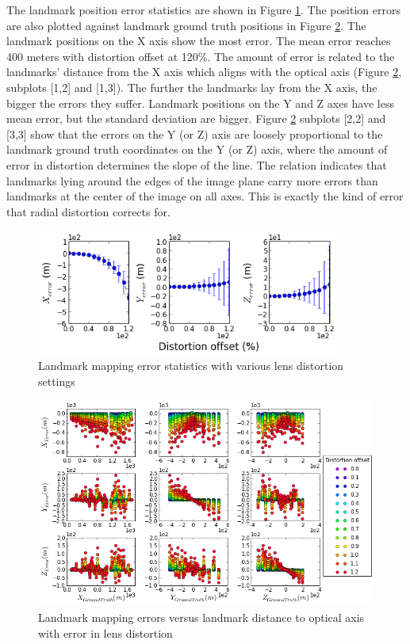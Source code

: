 The landmark position error statistics are shown in Figure
\ref{fig:simfig45}. The position errors are also plotted against
landmark ground truth positions in Figure \ref{fig:simfig46}. The
landmark positions on the X axis show the most error. The mean error
reaches 400 meters with distortion offset at 120\%. The amount of
error is related to the landmarks' distance from the X axis which aligns
with the optical axis (Figure \ref{fig:simfig46}, subplots [1,2] and
[1,3]). The further the landmarks lay from the X axis, the bigger the
errors they suffer. Landmark positions on the Y and Z axes have less
mean error, but the standard deviation are bigger. Figure
\ref{fig:simfig46} subplots [2,2] and [3,3] show that the errors on the
Y (or Z) axis are loosely proportional to the landmark ground truth
coordinates on the Y (or Z) axis, where the amount of error in distortion
determines the slope of the line. The relation indicates that
landmarks lying around the edges of the image plane carry more
errors than landmarks at the center of the image on all axes. This is
exactly the kind of error that radial distortion corrects for.

\begin{figure}[h]%
  \centering
  \includegraphics[width=10cm,keepaspectratio=true]{./Figures/SimulationFigures/Figure45.png}
  \caption{Landmark mapping error statistics with various lens
    distortion settings}
  \label{fig:simfig45}
\end{figure}

\begin{figure}[h] %
  \centering
  \includegraphics[width=13cm,keepaspectratio=true]{./Figures/SimulationFigures/Figure46.png}
  \caption{Landmark mapping errors versus landmark distance
    to optical axis with error in lens distortion}
  \label{fig:simfig46}
\end{figure}
\FloatBarrier


